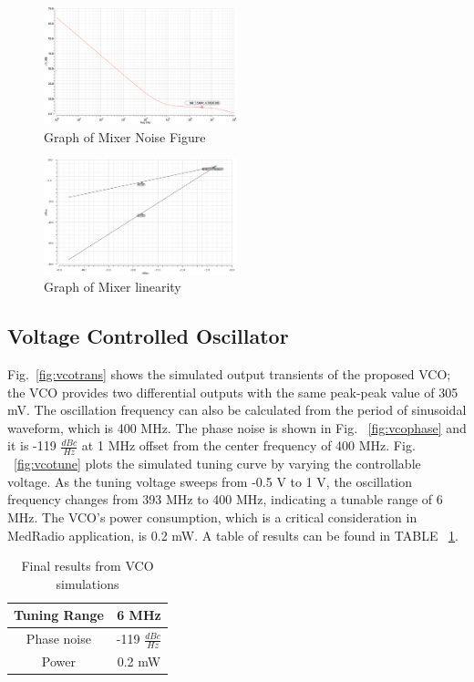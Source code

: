 \begin{figure}[h]
   \centering
    \includegraphics[width=0.5\textwidth]{figures/MixerNoiseFigure.png}
    \caption{Graph of Mixer Noise Figure}
    \label{fig:mixernoise}
\end{figure}

\begin{figure}[h]
   \centering
    \includegraphics[width=0.5\textwidth]{figures/mixerIIP3.png}
    \caption{Graph of Mixer linearity}
    \label{fig:mixerlin}
\end{figure}

\subsection{Voltage Controlled Oscillator}
Fig.~\ref{fig:vcotrans} shows the simulated output transients of the proposed VCO; the VCO provides two differential outputs with the same peak-peak value of 305 mV. The oscillation frequency can also be calculated from the period of sinusoidal waveform, which is 400 MHz. The phase noise is shown in Fig. ~\ref{fig:vcophase} and it is -119 $\frac{dBc}{Hz}$ at 1 MHz offset from the center frequency of 400 MHz. Fig. ~\ref{fig:vcotune} plots the simulated tuning curve by varying the controllable voltage. As the tuning voltage sweeps from -0.5 V to 1 V, the oscillation frequency changes from 393 MHz to 400 MHz, indicating a tunable range of 6 MHz. The VCO’s power consumption, which is a critical consideration in MedRadio application, is 0.2 mW. A table of results can be found in TABLE ~\ref{tab:vcoresults}.

\begin{table}[h]
\begin{center}
	\begin{tabular}{ |c | c | }
 		\hline                      
  		Tuning Range &  6 MHz \\ \hline
  		Phase noise &  -119 $\frac{dBc}{Hz}$ \\ \hline
		Power & 0.2 mW \\ 
  		\hline  
	\end{tabular}

\end{center}
\caption{Final results from VCO simulations}
\label{tab:vcoresults}
\end{table}

